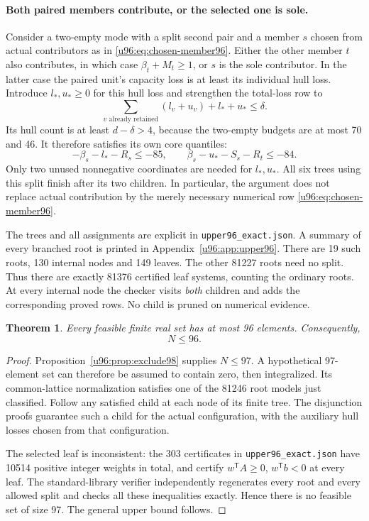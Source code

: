\documentclass[11pt,a4paper]{article}
\newtheorem{theorem}{Theorem}[section]
\theoremstyle{remark}
\begin{document}
\paragraph{Both paired members contribute, or the selected one is sole.}
Consider a two-empty mode with a split second pair and a member $s$
chosen from actual contributors as in \eqref{u96:eq:chosen-member96}.
Either the other member $t$ also contributes, in which case
$\beta_t+M_t\geq1$, or $s$ is the sole contributor. In the latter case
the paired unit's capacity loss is at least its individual hull loss.
Introduce $l_*,u_*\geq0$ for this hull loss and strengthen the total-loss
row to
\[
 \sum_{v\text{ already retained}}(l_v+u_v)+l_*+u_*\leq\delta.
\]
Its hull count is at least $d-\delta>4$, because the two-empty budgets
are at most 70 and 46. It therefore satisfies its own core quantiles:
\begin{equation}
 -\beta_s-l_*-R_s\leq-85,\qquad
 \beta_s-u_*-S_s-R_t\leq-84.\label{u96:eq:sole96}
\end{equation}
Only two unused nonnegative coordinates are needed for $l_*,u_*$.
All six trees using this split finish after its two children.
In particular, the argument does not replace actual contribution by the
merely necessary numerical row \eqref{u96:eq:chosen-member96}.

The trees and all assignments are explicit in
\texttt{upper96\_exact.json}. A summary of every branched root is printed
in Appendix~\ref{u96:app:upper96}. There are 19 such roots, 130 internal
nodes and 149 leaves. The other 81227 roots need no split. Thus there
are exactly 81376 certified leaf systems, counting the ordinary roots.
At every internal node the checker visits \emph{both} children and adds
the corresponding proved rows. No child is pruned on numerical evidence.

\begin{theorem}\label{u96:thm:upper96}
Every feasible finite real set has at most 96 elements. Consequently,
\[
 \boxed{N\leq96}.
\]
\end{theorem}
\begin{proof}
Proposition~\ref{u96:prop:exclude98} supplies $N\leq97$.
A hypothetical 97-element set can therefore be assumed to contain zero,
then integralized. Its common-lattice normalization satisfies one of the
81246 root models just classified. Follow any satisfied child at each
node of its finite tree. The disjunction proofs guarantee such a child
for the actual configuration, with the auxiliary hull losses chosen
from that configuration.

The selected leaf is inconsistent: the 303 certificates in
\texttt{upper96\_exact.json} have 10514 positive integer weights in total,
and certify $w^{\mathsf T}A\geq0$, $w^{\mathsf T}b<0$ at every leaf.
The standard-library verifier independently regenerates every root and
every allowed split and checks all these inequalities exactly. Hence
there is no feasible set of size 97. The general upper bound follows.

\end{proof}
\end{document}
